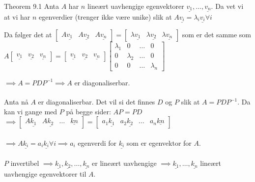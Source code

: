 \documentclass[11pt, a4paper, norsk]{article}
\begin{document}
        \begin{Proof}{Theorem 9.1}{}
            Anta $A$ har $n$ lineært uavhengige egenvektorer $\underline{v_1}, \dots ,\underline{v_{n}}$. Da vet vi at vi har $n$ egenverdier (trenger ikke være unike) slik at $A\underline{v_{i}} = \lambda_{i}\underline{v_{i}} \forall i$

            Da følger det at $\begin{bmatrix}
                A\underline{v_1} & A\underline{v_2} & A\underline{v_{n}}
            \end{bmatrix} = \begin{bmatrix}
                \lambda\underline{v_1} & \lambda\underline{v_2} & \lambda\underline{v_{n}}
            \end{bmatrix}$ som er det samme som $A\begin{bmatrix}
                \underline{v_1} & \underline{v_2} & \underline{v_{n}}\end{bmatrix} = \begin{bmatrix}
                    \underline{v_1} & \underline{v_2} & \underline{v_{n}}
                \end{bmatrix}\begin{bmatrix}
                    \lambda_1 & 0 & \dots & 0 \\
                    0 & \lambda_2 & \dots & 0 \\
                    0 & 0 & \dots & \lambda_{n}
                \end{bmatrix}$

                $\implies A = PDP^{-1} \implies A$ er diagonaliserbar.
                \\
                \\
                Anta nå $A$ er diagonaliserbar. Det vil si det finnes $D$ og $P$ slik at $A = PDP^{-1}$. Da kan vi gange med $P$ på begge sider: $AP = PD$
                \\
                $\implies \begin{bmatrix}
                    A\underline{k_1} & A\underline{k_2} & \dots & \underline{kn}
                \end{bmatrix} = \begin{bmatrix}
                    a_1\underline{k_1} & a_2\underline{k_2} & \dots & a_{n}\underline{kn}
                \end{bmatrix}$
                \\
                \\
                $\implies A\underline{k_{i}} = a_{i}\underline{k_{i}} \forall i \implies a_{i}$ egenverdi for $\underline{k_{i}}$ som er egenvektor for $A$. 
                \\
                \\
                $P$ invertibel $\implies \underline{k_1}, \underline{k_2}, \dots ,\underline{k_{n}}$ er lineært uavhengige $\implies \underline{k_1}, \dots ,\underline{k_{n}}$ lineært uavhengige egenvektorer til $A$. 
        \end{Proof}
\end{document}
